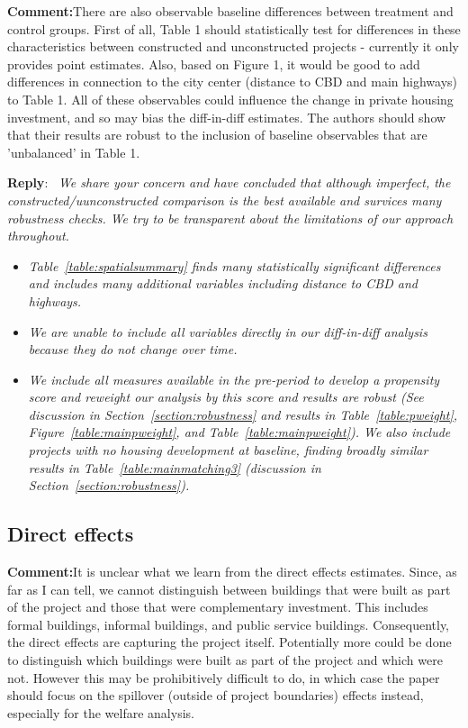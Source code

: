 \documentclass{article}
\newcounter{reviewer}
\newcounter{point}[reviewer]
\newcommand{\reply}{\medskip \noindent \textbf{Reply}:\ \textit }
\newcommand{\sr}{\begin{minipage}{\dimexpr\textwidth-3cm}}
\newcommand{\er}{\end{minipage}}
\newcommand{\cc}{\medskip \noindent \textbf{Comment:}\hspace{2em}}
\begin{document}
\cc There are also observable baseline differences between treatment and control groups. First of all, Table 1 should statistically test for differences in these characteristics between constructed and unconstructed projects - currently it only provides point estimates. Also, based on Figure 1, it would be good to add differences in connection to the city center (distance to CBD and main highways) to Table 1. All of these observables could influence the change in private housing investment, and so may bias the diff-in-diff estimates. The authors should show that their results are robust to the inclusion of baseline observables that are 'unbalanced' in Table 1.

\sr
\reply{  We share your concern and have concluded that although imperfect, the constructed/uunconstructed comparison is the best available and survices many robustness checks.  We try to be transparent about the limitations of our approach throughout. }
\begin{itemize}
    \item \textit{ Table~\ref{table:spatialsummary} finds many statistically significant differences and includes many additional variables including distance to CBD and highways.}
    \item \textit{ We are unable to include all variables directly in our diff-in-diff analysis because they do not change over time.}
    \item \textit{   We include all measures available in the pre-period to develop a propensity score and reweight our analysis by this score and results are robust (See discussion in Section~\ref{section:robustness}  and results in Table~\ref{table:pweight}, Figure~\ref{table:mainpweight}, and Table~\ref{table:mainpweight}).  We also include projects with no housing development at baseline, finding broadly similar results in Table~\ref{table:mainmatching3} (discussion in Section~\ref{section:robustness}). }\\
\end{itemize}
\er

\subsection{Direct effects}

\cc It is unclear what we learn from the direct effects estimates. Since, as far as I can tell, we cannot distinguish between buildings that were built as part of the project and those that were complementary investment. This includes formal buildings, informal buildings, and public service buildings. Consequently, the direct effects are capturing the project itself. Potentially more could be done to distinguish which buildings were built as part of the project and which were not. However this may be prohibitively difficult to do, in which case the paper should focus on the spillover (outside of project boundaries) effects instead, especially for the welfare analysis.
\end{document}
